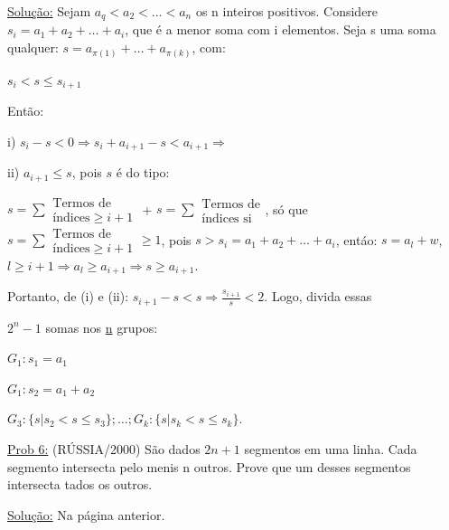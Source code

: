 \documentclass[a4paper,12pt]{article}
\renewcommand{\leq}{\ensuremath{\leqslant}}
\renewcommand{\geq}{\ensuremath{\geqslant}}
\theoremstyle{plain} %
\theoremstyle{definition} %
\theoremstyle{remark} %
\begin{document}
	\begin{framed}
		\underline{Solu\c{c}\~ao:} Sejam $a_q<a_2<\dotso<a_n$ os n inteiros positivos. Considere $s_i=a_1+a_2+\dotso+a_i$, que \'e a menor soma com i elementos. Seja s uma soma qualquer: $s=a_{\pi(1)}+\dotso+a_{\pi(k)}$, com: 
		
		\begin{center}
			$s_i<s\leq s_{i+1}$
		\end{center}
		
		Ent\~ao:
		
		i) $s_i-s<0\Rightarrow s_i+a_{i+1}-s<a_{i+1}\Rightarrow$ 
		
		ii) $a_{i+1}\leq s$, pois $s$ \'e do tipo:
		
		$s=\sum \begin{smallmatrix}
			\text{Termos de}\\
			\text{\'indices}\geq i+1
		\end{smallmatrix}$ + $s=\sum \begin{smallmatrix}
			\text{Termos de}\\
			\text{\'indices si}
		\end{smallmatrix}$, s\'o que $s=\sum \begin{smallmatrix}
			\text{Termos de}\\
			\text{\'indices}\geq i+1
		\end{smallmatrix} \geq 1$, pois $s>s_i=a_1+a_2+\dotso+a_i$, ent\'ao: $s=a_l+w$, $l\geq i+1\Rightarrow a_l\geq a_{i+1}\Rightarrow s\geq a_{i+1}$.
		
		Portanto, de (i) e (ii): $s_{i+1}-s<s\Rightarrow \frac{s_{i+1}}{s}<2$. Logo, divida essas
		
		$2^n-1$ somas nos \underline{n} grupos:
		
		$G_1: s_1=a_1$
		
		$G_1: s_2=a_1+a_2$
		
		$G_3: \{s|s_2<s\leq s_3\}; \dotso; G_k: \{s|s_k<s\leq s_k\}$. \tiny\textblock
	\end{framed}
	
	\normalsize
	
	\vspace{2ex}\underline{Prob 6:} (R\'USSIA/2000) S\~ao dados $2n+1$ segmentos em uma linha. Cada segmento intersecta pelo menis n outros. Prove que um desses segmentos intersecta tados os outros.
	
	\begin{framed}
		\underline{Solu\c{c}\~ao:} Na p\'agina anterior. \tiny\textblock
	\end{framed}
	
\end{document}
